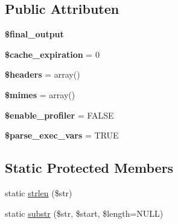 \subsection*{Public Attributen}
\begin{DoxyCompactItemize}
\item 
\mbox{\label{class_c_i___output_aa1b5049c03b9ef373af010aa3cda17a3}} 
{\bfseries \$final\+\_\+output}
\item 
\mbox{\label{class_c_i___output_a4a65b5005fdb96d5bdac5d642a022f16}} 
{\bfseries \$cache\+\_\+expiration} = 0
\item 
\mbox{\label{class_c_i___output_a52500036ee807241b8b4b7e2367c49ef}} 
{\bfseries \$headers} = array()
\item 
\mbox{\label{class_c_i___output_a2ce7d338d1fd0f0d971ba6213ac298a2}} 
{\bfseries \$mimes} = array()
\item 
\mbox{\label{class_c_i___output_a85f3ab9485440090efd4e0ae9a070747}} 
{\bfseries \$enable\+\_\+profiler} = F\+A\+L\+SE
\item 
\mbox{\label{class_c_i___output_a254d73d122352494697cdba0c509086d}} 
{\bfseries \$parse\+\_\+exec\+\_\+vars} = T\+R\+UE
\end{DoxyCompactItemize}
\subsection*{Static Protected Members}
\begin{DoxyCompactItemize}
\item 
static \mbox{\hyperlink{class_c_i___output_a4c29a687d4ed62c26a10e41d98930d5f}{strlen}} (\$str)
\item 
static \mbox{\hyperlink{class_c_i___output_a101caef57ef0b165da5747e2c2e6c9dc}{substr}} (\$str, \$start, \$length=N\+U\+LL)
\end{DoxyCompactItemize}
